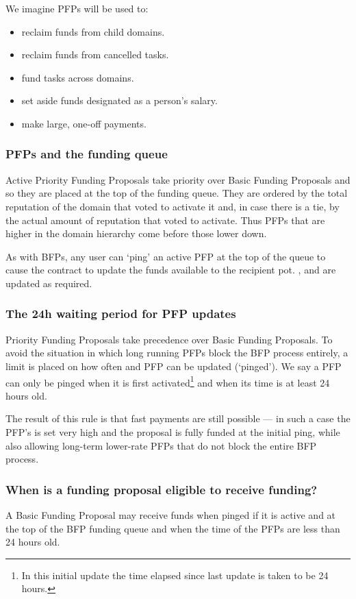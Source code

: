 We imagine PFPs will be used to:
\begin{itemize}
 \item reclaim funds from child domains.
 \item reclaim funds from cancelled tasks.
 \item fund tasks across domains.
 \item set aside funds designated as a person's salary.
 \item make large, one-off payments.
 \end{itemize}


\subsubsection{PFPs and the funding queue}

Active Priority Funding Proposals take priority over Basic Funding Proposals and so they are placed at the top of the funding queue. They are ordered by the total reputation of the domain that voted to activate it and, in case there is a tie, by the actual amount of reputation that voted to activate. Thus PFPs that are higher in the domain hierarchy come before those lower down.

As with BFPs, any user can `ping' an active PFP at the top of the queue to cause the contract to update the funds available to the recipient pot. ,  and  are updated as required.

\subsubsection{The 24h waiting period for PFP updates}
Priority Funding Proposals take precedence over Basic Funding Proposals. To avoid the situation in which long running PFPs block the BFP process entirely, a limit is placed on how often and PFP can be updated (`pinged'). We say a PFP can only be pinged when it is first activated\footnote{In this initial update the time elapsed since last update is taken to be 24 hours.} and when its  time is at least 24 hours old.

The result of this rule is that fast payments are still possible --- in such a case the PFP's  is set very high and the proposal is fully funded at the initial ping, while also allowing long-term lower-rate PFPs that do not block the entire BFP process.

\subsubsection{When is a funding proposal eligible to receive funding?}
A Basic Funding Proposal may receive funds when pinged if it is active and at the top of the BFP funding queue and when the  time of the PFPs are less than 24 hours old.

